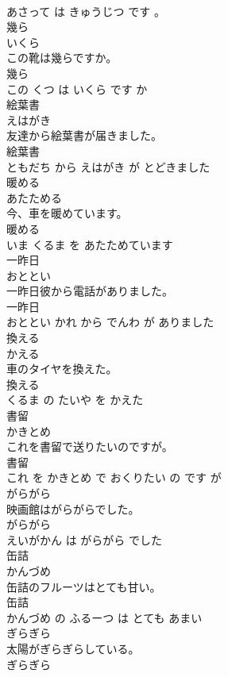 \documentclass[8pt]{extreport}
\begin{document}
\begin{CJK}{UTF8}{min}
\\	あさって は きゅうじつ です 。			
\\	幾ら	
\\	いくら			
\\	この靴は幾らですか。	
\\	幾ら 
\\	この くつ は いくら です か			
\\	絵葉書	
\\	えはがき			
\\	友達から絵葉書が届きました。	
\\	絵葉書 
\\	ともだち から えはがき が とどきました			
\\	暖める	
\\	あたためる			
\\	今、車を暖めています。	
\\	暖める 
\\	いま くるま を あたためています			
\\	一昨日	
\\	おととい			
\\	一昨日彼から電話がありました。	
\\	一昨日 
\\	おととい かれ から でんわ が ありました			
\\	換える	
\\	かえる			
\\	車のタイヤを換えた。	
\\	換える 
\\	くるま の たいや を かえた			
\\	書留	
\\	かきとめ			
\\	これを書留で送りたいのですが。	
\\	書留 
\\	これ を かきとめ で おくりたい の です が			
\\	がらがら	
\\	映画館はがらがらでした。	
\\	がらがら 
\\	えいがかん は がらがら でした			
\\	缶詰	
\\	かんづめ			
\\	缶詰のフルーツはとても甘い。	
\\	缶詰 
\\	かんづめ の ふるーつ は とても あまい			
\\	ぎらぎら	
\\	太陽がぎらぎらしている。	
\\	ぎらぎら 

\end{CJK}
\end{document}
